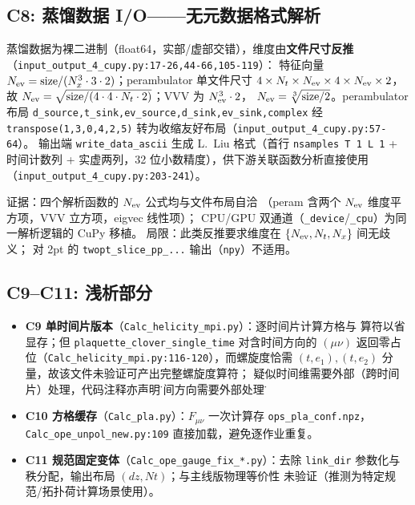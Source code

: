 \documentclass[UTF8]{ctexart}
\begin{document}
\subsection{C8: 蒸馏数据 I/O——无元数据格式解析}
蒸馏数据为裸二进制（float64，实部/虚部交错），维度由\textbf{文件尺寸反推}
（\texttt{\nolinkurl{input_output_4_cupy.py:17-26,44-66,105-119}}）：
特征向量 $N_{\rm ev}=\text{size}/(N_x^3\cdot 3\cdot 2)$；perambulator 单文件尺寸
$4\times N_t\times N_{\rm ev}\times 4\times N_{\rm ev}\times 2$，故
$N_{\rm ev}=\sqrt{\text{size}/(4\cdot 4\cdot N_t\cdot 2)}$；VVV 为 $N_{\rm ev}^3\cdot 2$，
$N_{\rm ev}=\sqrt[3]{\text{size}/2}$。perambulator 布局
\texttt{d\_source,t\_sink,ev\_source,d\_sink,ev\_sink,complex} 经
\texttt{transpose(1,3,0,4,2,5)} 转为收缩友好布局（\texttt{\nolinkurl{input_output_4_cupy.py:57-64}}）。
输出端 \texttt{write\_data\_ascii} 生成 L.~Liu 格式（首行 \texttt{nsamples T 1 L 1} + 时间计数列 +
实虚两列，32 位小数精度），供下游关联函数分析直接使用
（\texttt{\nolinkurl{input_output_4_cupy.py:203-241}}）。



\textcolor{evidence}{证据}：四个解析函数的 $N_{\rm ev}$ 公式均与文件布局自洽
（peram 含两个 $N_{\rm ev}$ 维度平方项，VVV 立方项，eigvec 线性项）；
CPU/GPU 双通道（\texttt{\_device}/\texttt{\_cpu}）为同一解析逻辑的 CuPy 移植。
\textcolor{warn}{局限}：此类反推要求维度在 $\{N_{\rm ev},N_t,N_x\}$ 间无歧义；
对 2pt 的 \texttt{twopt\_slice\_pp\_...} 输出（\texttt{npy}）不适用。

\subsection{C9--C11: 浅析部分}
\begin{itemize}
\item \textbf{C9 单时间片版本}（\texttt{\nolinkurl{Calc_helicity_mpi.py}}）：逐时间片计算方格与
  算符以省显存；但 \texttt{plaquette\_clover\_single\_time} 对含时间方向的 $(\mu\nu)$
  返回零占位（\texttt{\nolinkurl{Calc_helicity_mpi.py:116-120}}），而螺旋度恰需
  $(t,e_1),(t,e_2)$ 分量，故该文件\textcolor{warn}{未验证}可产出完整螺旋度算符；
  疑似时间维需要外部（跨时间片）处理，代码注释亦声明\"时间方向需要外部处理\"。
\item \textbf{C10 方格缓存}（\texttt{\nolinkurl{Calc_pla.py}}）：$F_{\mu\nu}$ 一次计算存
  \texttt{ops\_pla\_conf.npz}，\texttt{Calc\_ope\_unpol\_new.py:109} 直接加载，避免逐作业重复。
\item \textbf{C11 规范固定变体}（\texttt{Calc\_ope\_gauge\_fix\_*.py}）：去除
  \texttt{link\_dir} 参数化与秩分配，输出布局 $(dz,Nt)$；与主线版物理等价性
  \textcolor{warn}{未验证}（推测为特定规范/拓扑荷计算场景使用）。
\end{itemize}
\end{document}
